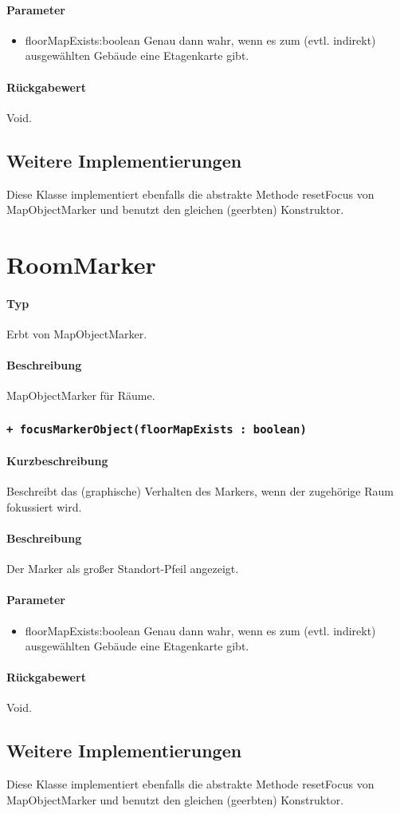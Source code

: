 \paragraph*{Parameter}
\begin{itemize}
    \item floorMapExists:boolean Genau dann wahr, wenn es zum (evtl. indirekt) ausgewählten Gebäude eine Etagenkarte gibt.
\end{itemize}
\paragraph*{Rückgabewert}
Void.

\subsection{Weitere Implementierungen}
Diese Klasse implementiert ebenfalls die abstrakte Methode resetFocus von MapObjectMarker 
und benutzt den gleichen (geerbten) Konstruktor.

\section{RoomMarker}
\paragraph*{Typ} 
Erbt von MapObjectMarker.
\paragraph*{Beschreibung}
MapObjectMarker für Räume.

\subsubsection{\texttt{+ focusMarkerObject(floorMapExists : boolean)}}%
\paragraph*{Kurzbeschreibung}
Beschreibt das (graphische) Verhalten des Markers, wenn der zugehörige Raum fokussiert wird.
\paragraph*{Beschreibung}
Der Marker als großer Standort-Pfeil angezeigt.
\paragraph*{Parameter}
\begin{itemize}
    \item floorMapExists:boolean Genau dann wahr, wenn es zum (evtl. indirekt) ausgewählten Gebäude eine Etagenkarte gibt.
\end{itemize}
\paragraph*{Rückgabewert}
Void.

\subsection{Weitere Implementierungen}
Diese Klasse implementiert ebenfalls die abstrakte Methode resetFocus von MapObjectMarker 
und benutzt den gleichen (geerbten) Konstruktor.
